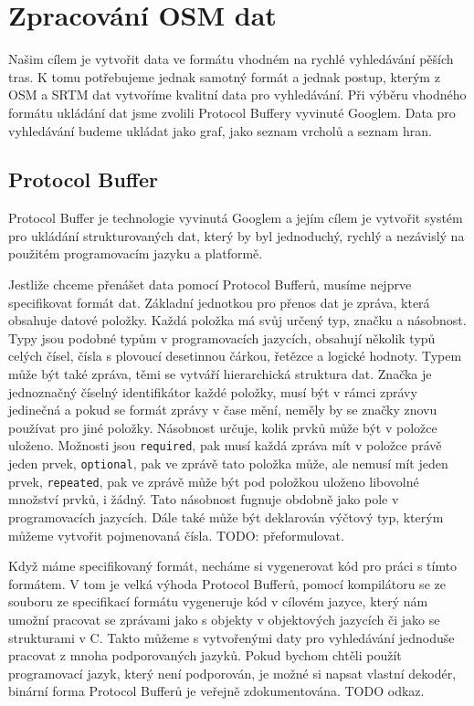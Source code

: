 \chapter{Zpracování OSM dat}
Našim cílem je vytvořit data ve formátu vhodném na rychlé vyhledávání pěších
tras. K tomu potřebujeme jednak samotný formát a jednak postup, kterým z OSM a
SRTM dat vytvoříme kvalitní data pro vyhledávání. Při výběru vhodného formátu
ukládání dat jsme zvolili Protocol Buffery vyvinuté Googlem\cite{pbfweb}. Data
pro vyhledávání budeme ukládat jako graf, jako seznam vrcholů a seznam hran.

\section{Protocol Buffer}
Protocol Buffer je technologie vyvinutá Googlem a jejím cílem je vytvořit systém
pro ukládání strukturovaných dat, který by byl jednoduchý, rychlý a nezávislý na
použitém programovacím jazyku a platformě.

Jestliže chceme přenášet data pomocí Protocol Bufferů, musíme nejprve
specifikovat formát dat. Základní jednotkou pro přenos dat je zpráva, která
obsahuje datové položky. Každá položka má svůj určený typ, značku a násobnost.
{\tuc Typy} jsou podobné typům v programovacích jazycích, obsahují několik typů celých
čísel, čísla s plovoucí desetinnou čárkou, řetězce a logické hodnoty. Typem může
být také zpráva, těmi se vytváří hierarchická struktura dat. 
{\tuc Značka} je jednoznačný číselný identifikátor každé položky, musí být v rámci
zprávy jedinečná a pokud se formát zprávy v čase mění, neměly by se značky znovu
používat pro jiné položky.
{\tuc Násobnost} určuje, kolik prvků může být v položce uloženo. Možnosti jsou
\verb|required|, pak musí každá zpráva mít v položce právě jeden prvek,
\verb|optional|, pak ve zprávě tato položka může, ale nemusí mít jeden prvek,
\verb|repeated|, pak ve zprávě může být pod položkou uloženo libovolné množství
prvků, i žádný. Tato násobnost fugnuje obdobně jako pole v programovacích
jazycích. Dále také může být deklarován výčtový typ, kterým můžeme vytvořit
pojmenovaná čísla. TODO: přeformulovat.

Když máme specifikovaný formát, necháme si vygenerovat kód pro práci s tímto
formátem. V tom je velká výhoda Protocol Bufferů, pomocí kompilátoru se ze
souboru ze specifikací formátu vygeneruje kód v cílovém jazyce, který nám umožní
pracovat se zprávami jako s objekty v objektových jazycích či jako se
strukturami v C. Takto můžeme s vytvořenými daty pro vyhledávání jednoduše
pracovat z mnoha podporovaných jazyků. Pokud bychom chtěli použít programovací
jazyk, který není podporován, je možné si napsat vlastní dekodér, binární forma
Protocol Bufferů je veřejně zdokumentována. TODO odkaz.

